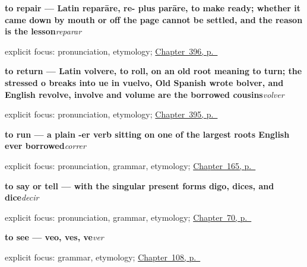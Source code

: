\noindent\begin{minipage}[t]{\linewidth}
\raggedright
\textbf{to repair — Latin reparāre, re- plus parāre, to make ready; whether it came down by mouth or off the page cannot be settled, and the reason is the lesson}\enspace\emph{reparar}\par
\footnotesize explicit focus: pronunciation, etymology; \hyperref[ch:aprender-y-cocinar]{Chapter~396, p.~\pageref*{ch:aprender-y-cocinar}}
\end{minipage}\par\smallskip

\noindent\begin{minipage}[t]{\linewidth}
\raggedright
\textbf{to return — Latin volvere, to roll, on an old root meaning to turn; the stressed o breaks into ue in vuelvo, Old Spanish wrote bolver, and English revolve, involve and volume are the borrowed cousins}\enspace\emph{volver}\par
\footnotesize explicit focus: pronunciation, etymology; \hyperref[ch:entrar-y-volver]{Chapter~395, p.~\pageref*{ch:entrar-y-volver}}
\end{minipage}\par\smallskip

\noindent\begin{minipage}[t]{\linewidth}
\raggedright
\textbf{to run — a plain -er verb sitting on one of the largest roots English ever borrowed}\enspace\emph{correr}\par
\footnotesize explicit focus: pronunciation, grammar, etymology; \hyperref[ch:spanish-hear-sleep-walk-run]{Chapter~165, p.~\pageref*{ch:spanish-hear-sleep-walk-run}}
\end{minipage}\par\smallskip

\noindent\begin{minipage}[t]{\linewidth}
\raggedright
\textbf{to say or tell — with the singular present forms digo, dices, and dice}\enspace\emph{decir}\par
\footnotesize explicit focus: pronunciation, grammar, etymology; \hyperref[ch:yo-go-verbs]{Chapter~70, p.~\pageref*{ch:yo-go-verbs}}
\end{minipage}\par\smallskip

\noindent\begin{minipage}[t]{\linewidth}
\raggedright
\textbf{to see — veo, ves, ve}\enspace\emph{ver}\par
\footnotesize explicit focus: grammar, etymology; \hyperref[ch:spanish-ver]{Chapter~108, p.~\pageref*{ch:spanish-ver}}
\end{minipage}\par\smallskip

